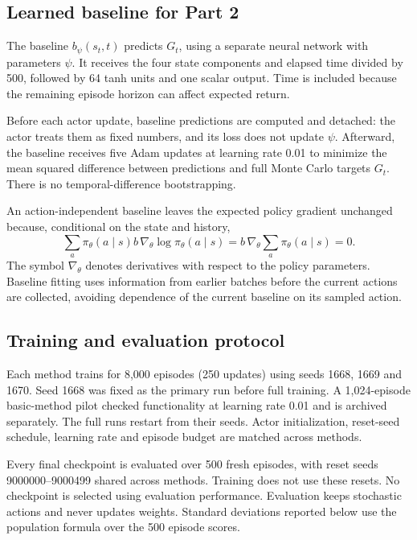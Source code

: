 \documentclass[11pt,letterpaper]{article}
\begin{document}
\subsection{Learned baseline for Part 2}
The baseline $b_\psi(s_t,t)$ predicts $G_t$, using a separate neural network with parameters $\psi$. It receives the four state components and elapsed time divided by 500, followed by 64 tanh units and one scalar output. Time is included because the remaining episode horizon can affect expected return.

Before each actor update, baseline predictions are computed and detached: the actor treats them as fixed numbers, and its loss does not update $\psi$. Afterward, the baseline receives five Adam updates at learning rate 0.01 to minimize the mean squared difference between predictions and full Monte Carlo targets $G_t$. There is no temporal-difference bootstrapping.

An action-independent baseline leaves the expected policy gradient unchanged because, conditional on the state and history,
\begin{equation}
\sum_a\pi_\theta(a\mid s)b\,\nabla_\theta\log\pi_\theta(a\mid s)
=b\,\nabla_\theta\sum_a\pi_\theta(a\mid s)=0.
\end{equation}
The symbol $\nabla_\theta$ denotes derivatives with respect to the policy parameters. Baseline fitting uses information from earlier batches before the current actions are collected, avoiding dependence of the current baseline on its sampled action.

\subsection{Training and evaluation protocol}
Each method trains for 8,000 episodes (250 updates) using seeds 1668, 1669 and 1670. Seed 1668 was fixed as the primary run before full training. A 1,024-episode basic-method pilot checked functionality at learning rate 0.01 and is archived separately. The full runs restart from their seeds. Actor initialization, reset-seed schedule, learning rate and episode budget are matched across methods.

Every final checkpoint is evaluated over 500 fresh episodes, with reset seeds 9000000--9000499 shared across methods. Training does not use these resets. No checkpoint is selected using evaluation performance. Evaluation keeps stochastic actions and never updates weights. Standard deviations reported below use the population formula over the 500 episode scores.
\end{document}
